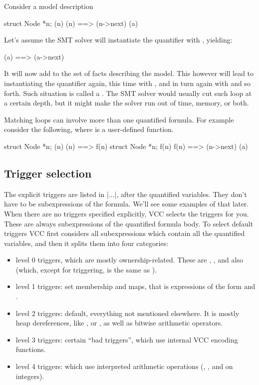 Consider a model description
\begin{VCC}
\forall struct Node *n; {\mine(n)} \mine(n) ==> \mine(n->next)
\mine(a)
\end{VCC}
Let's assume the SMT solver will instantiate the quantifier with , yielding:
\begin{VCC}
\mine(a) ==> \mine(a->next)
\end{VCC}
It will now add  to the set of facts
describing the model.
This however will lead to instantiating the quantifier again,
this time with , and in turn again with
 and so forth.
Such situation is called a .
The SMT solver would usually cut such loop at a certain depth,
but it might make the solver run out of time, memory, or both.

Matching loops can involve more than one quantified formula. 
For example consider the following, where  is a user-defined function.
\begin{VCC}
\forall struct Node *n; {\mine(n)} \mine(n) ==> f(n)
\forall struct Node *n; {f(n)} f(n) ==> \mine(n->next)
\mine(a)
\end{VCC}


\subsection{Trigger selection}
\label{sect:trigger-inference}

The explicit triggers are listed in \vcc|{...}|, after the quantified variables.
They don't have to be subexpressions of the formula. 
We'll see some examples of that later.
When there are no triggers specified explicitly, VCC selects the triggers for you.
These are always subexpressions of the quantified formula body.
To select default triggers VCC first considers all subexpressions which contain all the quantified variables,
and then it splits them into four categories:
\begin{itemize}
\item level 0 triggers, which are mostly ownership-related. 
These are , , and also  (which, except for triggering, is the same as ).
\item level 1 triggers: set membership and maps, that is expressions of 
the form  and .
\item level 2 triggers: default, \ie everything not mentioned elsewhere. 
It is mostly heap dereferences, like ,  or , as well as bitwise arithmetic operators.
\item level 3 triggers: certain ``bad triggers'', which use internal VCC encoding functions.
\item level 4 triggers: which use interpreted arithmetic operations (\vcc{+}, \vcc{-}, and \vcc{*} on integers).
\end{itemize}

